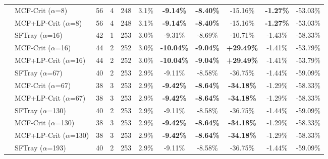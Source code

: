 \begin{table}[t]
{\begin{tabular}{ll|cccc|ccc|cc}
 & MCF-Crit ($\alpha$=8) & 56 & 4 & 248 & 3.1\% & \textbf{-9.14\%} & \textbf{-8.40\%} & -15.16\% & \textbf{-1.27\%} & -53.03\% \\

 & MCF+LP-Crit ($\alpha$=8) & 56 & 4 & 248 & 3.1\% & \textbf{-9.14\%} & \textbf{-8.40\%} & -15.16\% & \textbf{-1.27\%} & -53.03\% \\

\addlinespace[0.5em]

 & SFTray ($\alpha$=16) & 42 & 1 & 253 & 3.0\% & -9.31\% & -8.69\% & -10.71\% & -1.43\% & -58.33\% \\

 & MCF-Crit ($\alpha$=16) & 44 & 2 & 252 & 3.0\% & \textbf{-10.04\%} & \textbf{-9.04\%} & \textbf{+29.49\%} & -1.41\% & -53.79\% \\

 & MCF+LP-Crit ($\alpha$=16) & 44 & 2 & 252 & 3.0\% & \textbf{-10.04\%} & \textbf{-9.04\%} & \textbf{+29.49\%} & -1.41\% & -53.79\% \\

\addlinespace[0.5em]

 & SFTray ($\alpha$=67) & 40 & 2 & 253 & 2.9\% & -9.11\% & -8.58\% & -36.75\% & -1.44\% & -59.09\% \\

 & MCF-Crit ($\alpha$=67) & 38 & 3 & 253 & 2.9\% & \textbf{-9.42\%} & \textbf{-8.64\%} & \textbf{-34.18\%} & -1.29\% & -58.33\% \\

 & MCF+LP-Crit ($\alpha$=67) & 38 & 3 & 253 & 2.9\% & \textbf{-9.42\%} & \textbf{-8.64\%} & \textbf{-34.18\%} & -1.29\% & -58.33\% \\

\addlinespace[0.5em]

 & SFTray ($\alpha$=130) & 40 & 2 & 253 & 2.9\% & -9.11\% & -8.58\% & -36.75\% & -1.44\% & -59.09\% \\

 & MCF-Crit ($\alpha$=130) & 38 & 3 & 253 & 2.9\% & \textbf{-9.42\%} & \textbf{-8.64\%} & \textbf{-34.18\%} & -1.29\% & -58.33\% \\

 & MCF+LP-Crit ($\alpha$=130) & 38 & 3 & 253 & 2.9\% & \textbf{-9.42\%} & \textbf{-8.64\%} & \textbf{-34.18\%} & -1.29\% & -58.33\% \\

\addlinespace[0.5em]

 & SFTray ($\alpha$=193) & 40 & 2 & 253 & 2.9\% & -9.11\% & -8.58\% & -36.75\% & -1.44\% & -59.09\% \\


\end{tabular}}
\end{table}
